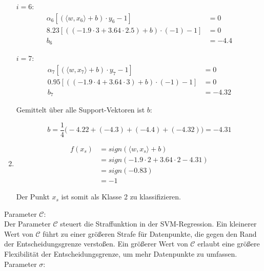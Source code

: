 \documentclass[a4paper,12pt]{article}
\begin{document}
\begin{enumerate}
	$i = 6$:
	\begin{align*}
		\alpha_6 \left[(\langle w, x_6 \rangle + b) \cdot y_6 - 1 \right] &= 0 \\
		8.23 \left[((-1.9 \cdot 3 + 3.64 \cdot 2.5) + b) \cdot (-1) - 1 \right] &= 0 \\
		b_6 &= -4.4
	\end{align*}

	$i = 7$:
	\begin{align*}
		\alpha_7 \left[(\langle w, x_7 \rangle + b) \cdot y_7 - 1 \right] &= 0 \\
		0.95 \left[((-1.9 \cdot 4 + 3.64 \cdot 3) + b) \cdot (-1) - 1 \right] &= 0 \\
		b_7 &= -4.32
	\end{align*}
	
	Gemittelt über alle Support-Vektoren ist $b$:

	\[b = \frac{1}{4} \biggl(-4.22 + (-4.3) + (-4.4) + (-4.32)\biggr) = -4.31 \]
	
	\item

	\begin{align*}
		f(x_s) &= sign(\langle w, x_s\rangle + b) \\
			&= sign(-1.9 \cdot 2 + 3.64 \cdot 2 - 4.31) \\
			&= sign(-0.83) \\
			&= -1 
	\end{align*}

	Der Punkt $x_s$ ist somit als Klasse 2 zu klassifizieren.
\end{enumerate}





Parameter $\mathcal{C}$:\\

Der Parameter $\mathcal{C}$ steuert die Straffunktion in der SVM-Regression. 
Ein kleinerer Wert von $\mathcal{C}$ führt zu einer größeren Strafe für Datenpunkte, 
die gegen den Rand der Entscheidungsgrenze verstoßen. Ein größerer Wert von $\mathcal{C}$ erlaubt eine 
größere Flexibilität der Entscheidungsgrenze, um mehr Datenpunkte zu umfassen. \\




Parameter $\sigma$:\\
\end{document}
